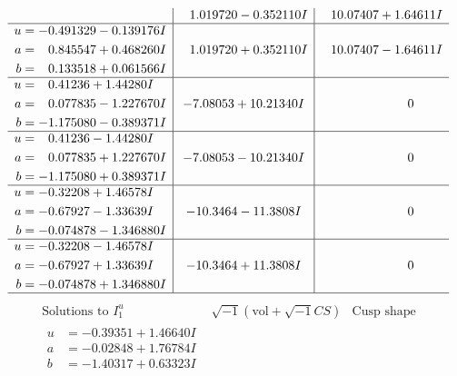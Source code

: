 \documentclass[1p]{elsarticle_modified}
\theoremstyle{definition}
\newcommand{\I}{\sqrt{-1}}
\begin{document}
$$\begin{array}{c|c|c}
 & \phantom{-}1.019720 - 0.352110 I & \phantom{-}10.07407 + 1.64611 I \\ \hline\begin{aligned}
u &= -0.491329 - 0.139176 I \\
a &= \phantom{-}0.845547 + 0.468260 I \\
b &= \phantom{-}0.133518 + 0.061566 I\end{aligned}
 & \phantom{-}1.019720 + 0.352110 I & \phantom{-}10.07407 - 1.64611 I \\ \hline\begin{aligned}
u &= \phantom{-}0.41236 + 1.44280 I \\
a &= \phantom{-}0.077835 - 1.227670 I \\
b &= -1.175080 - 0.389371 I\end{aligned}
 & -7.08053 + 10.21340 I & \phantom{-0.000000 } 0 \\ \hline\begin{aligned}
u &= \phantom{-}0.41236 - 1.44280 I \\
a &= \phantom{-}0.077835 + 1.227670 I \\
b &= -1.175080 + 0.389371 I\end{aligned}
 & -7.08053 - 10.21340 I & \phantom{-0.000000 } 0 \\ \hline\begin{aligned}
u &= -0.32208 + 1.46578 I \\
a &= -0.67927 - 1.33639 I \\
b &= -0.074878 - 1.346880 I\end{aligned}
 & -10.3464 - 11.3808 I & \phantom{-0.000000 } 0 \\ \hline\begin{aligned}
u &= -0.32208 - 1.46578 I \\
a &= -0.67927 + 1.33639 I \\
b &= -0.074878 + 1.346880 I\end{aligned}
 & -10.3464 + 11.3808 I & \phantom{-0.000000 } 0\\
 \hline 
 \end{array}$$\newpage$$\begin{array}{c|c|c}  
\text{Solutions to }I^u_{1}& \I (\text{vol} + \sqrt{-1}CS) & \text{Cusp shape}\\
 \hline 
\begin{aligned}
u &= -0.39351 + 1.46640 I \\
a &= -0.02848 + 1.76784 I \\
b &= -1.40317 + 0.63323 I\end{aligned}

\end{array}$$
\end{document}
